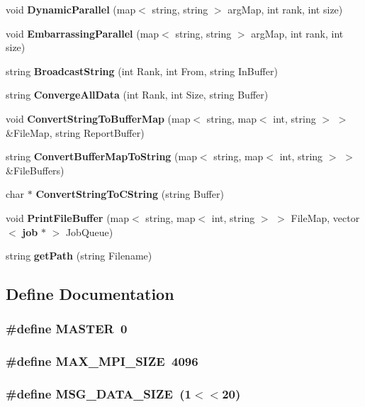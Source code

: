 \begin{CompactItemize}
void {\bf DynamicParallel} (map$<$ string, string $>$ argMap, int rank, int size)
\item 
void {\bf EmbarrassingParallel} (map$<$ string, string $>$ argMap, int rank, int size)
\item 
string {\bf BroadcastString} (int Rank, int From, string InBuffer)
\item 
string {\bf ConvergeAllData} (int Rank, int Size, string Buffer)
\item 
void {\bf ConvertStringToBufferMap} (map$<$ string, map$<$ int, string $>$ $>$ \&FileMap, string ReportBuffer)
\item 
string {\bf ConvertBufferMapToString} (map$<$ string, map$<$ int, string $>$ $>$ \&FileBuffers)
\item 
char $\ast$ {\bf ConvertStringToCString} (string Buffer)
\item 
void {\bf PrintFileBuffer} (map$<$ string, map$<$ int, string $>$ $>$ FileMap, vector$<$ {\bf job} $\ast$ $>$ JobQueue)
\item 
string {\bf getPath} (string Filename)
\end{CompactItemize}


\subsection{Define Documentation}
\subsubsection{\setlength{\rightskip}{0pt plus 5cm}\#define MASTER~0}\label{Scheduler_8h_3fa2d3bf1901157f734a584d47b25d8b}


\subsubsection{\setlength{\rightskip}{0pt plus 5cm}\#define MAX\_\-MPI\_\-SIZE~4096}\label{Scheduler_8h_d57d55a8edcc242da2bfd2167b640afd}


\subsubsection{\setlength{\rightskip}{0pt plus 5cm}\#define MSG\_\-DATA\_\-SIZE~(1$<$$<$20)}\label{Scheduler_8h_c917a0f8972158be55b6da9f6496ee0c}


